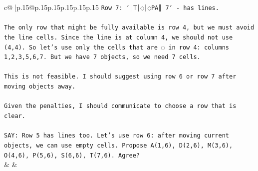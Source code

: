 \documentclass{article}
\begin{document}
{\begin{supertabular}{c@{$\;$}|p{.15\linewidth}@{}p{.15\linewidth}p{.15\linewidth}p{.15\linewidth}p{.15\linewidth}p{.15\linewidth}}
{{{\texttt{Row 7: `║T│◌│◌PA║ 7` {-} has lines.} \\
\\ 
\texttt{The only row that might be fully available is row 4, but we must avoid the line cells. Since the line is at column 4, we should not use (4,4). So let's use only the cells that are ◌ in row 4: columns 1,2,3,5,6,7. But we have 7 objects, so we need 7 cells.} \\
\\ 
\texttt{This is not feasible. I should suggest using row 6 or row 7 after moving objects away.} \\
\\ 
\texttt{Given the penalties, I should communicate to choose a row that is clear.} \\
\\ 
\texttt{SAY: Row 5 has lines too. Let's use row 6: after moving current objects, we can use empty cells. Propose A(1,6), D(2,6), M(3,6), O(4,6), P(5,6), S(6,6), T(7,6). Agree?} \\
            }
        }
    }
    & & \\ \\


\end{supertabular}}
\end{document}
